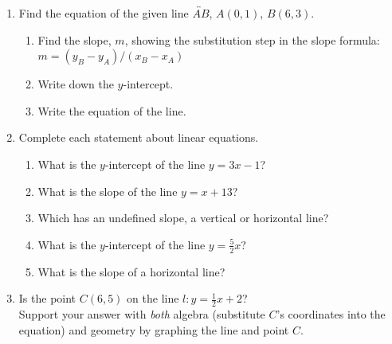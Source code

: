 \documentclass[12pt, twoside]{article}
\begin{document}
\begin{enumerate}
\newpage
\item Find the equation of the given line $\overleftrightarrow{AB}$, $A(0,1)$, $B(6,3)$.
\begin{multicols}{2}
    \begin{enumerate}[itemsep=1.2cm]
      \item Find the slope, $m$, showing the substitution step in the slope formula: \\[0.25cm]
      $\displaystyle m = (y_B - y_A)/(x_B - x_A)$
      \item Write down the $y$-intercept.
      \item Write the equation of the line.
      \end{enumerate}
    \begin{flushright}
    \end{flushright}
\end{multicols}

\newpage
\item Complete each statement about linear equations.
\begin{enumerate}[itemsep=0.5cm]
  \item What is the $y$-intercept of the line $y = 3x - 1$?
  \item What is the slope of the line $y = x + 13$?
  \item Which has an undefined slope, a vertical or horizontal line?
  \item What is the $y$-intercept of the line $y = \frac{5}{2}x$?
  \item What is the slope of a horizontal line?

\end{enumerate}

\newpage
\item Is the point $C(6,5)$ on the line $l: y=\frac{1}{2}x+2$? \\[0.5cm]
Support your answer with \emph{both} algebra (substitute $C$'s coordinates into the equation) and geometry by graphing the line and point $C$.
  \begin{flushright}
  \end{flushright}


\end{enumerate}
\end{document}

